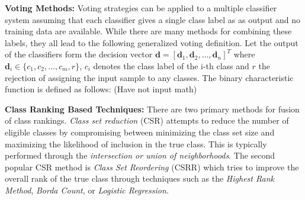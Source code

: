 \documentclass[]{article}
\begin{document}
			\noindent
			\textbf{Voting Methods:} \newline Voting strategies can be applied to a multiple classifier system assuming that each classifier gives a single class label as as output and no training data are available.  While there are many methods for combining these labels, they all lead to the following generalized voting definition.  Let the output of the classifiers form the decision vector $\bm{d} = [ \bm{d}_1, \bm{d}_2, \dots, \bm{d}_n ]^{T}$ where $\bm{d}_i \in \{ c_1, c_2, \dots, c_m, r \} $, $c_i$ denotes the class label of the i-th class and $r$ the rejection of assigning the input sample to any classes.  The binary characteristic function is defined as follows: (Have not input math)
			

			\noindent
			\textbf{Class Ranking Based Techniques:} \newline
			There are two primary methods for fusion of class rankings.  \textit{Class set reduction} (CSR) attempts to reduce the number of eligible classes by compromising between minimizing the class set size and maximizing the likelihood of inclusion in the true class.  This is typically performed through the \textit{intersection or union of neighborhoods}.  The second popular CSR method is \textit{Class Set Reordering} (CSRR) which tries to improve  the overall rank of the true class through techniques such as the \textit{Highest Rank Method}, \textit{Borda Count}, or \textit{Logistic Regression}.  
			
\end{document}
